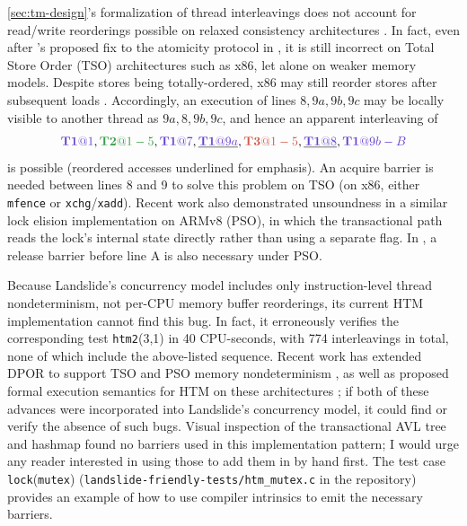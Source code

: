 \cref{sec:tm-design}'s formalization of thread interleavings does not account for read/write reorderings
possible on relaxed consistency architectures \cite{memory-consistency-models}.
In fact,
even after \cite{tm-benchmark-cmu}'s proposed fix to the atomicity protocol in ,
it is still incorrect on Total Store Order (TSO) architectures such as x86,
let alone on weaker memory models.
Despite stores being totally-ordered, x86 may still reorder stores after subsequent loads
\cite{sully-thesis}.
Accordingly, an execution of lines $8,9a,9b,9c$
may be locally visible to another thread as $9a,8,9b,9c$,
and hence an apparent interleaving of
\[
        \tiat{1},\tjat{1-5},\tiat{7},\underline{\tiat{9a}},\tkat{1-5},\underline{\tiat{8}},\tiat{9b-B}
\]
is possible
(reordered accesses underlined for emphasis).
An acquire barrier is needed between lines 8 and 9 to solve this problem on TSO \cite{tsx-need-barrier}
(on x86, either {\tt mfence} or {\tt xchg}/{\tt xadd}).
Recent work \cite{relaxed-transactions-pldi} also demonstrated unsoundness
in a similar lock elision implementation on ARMv8 (PSO),
in which the transactional path reads the lock's internal state directly
rather than using a separate flag.
In , a release barrier before line A is also necessary under PSO.

Because Landslide's concurrency model includes only instruction-level thread nondeterminism,
not per-CPU memory buffer reorderings,
its current HTM implementation cannot find this bug.
In fact, it erroneously verifies the corresponding test {\tt htm2}(3,1)
in 40 CPU-seconds,
with 774 interleavings in total,
none of which include the above-listed sequence.
Recent work has extended DPOR to support TSO and PSO memory nondeterminism \cite{tsopso},
as well as proposed formal execution semantics for HTM on these architectures
\cite{relaxed-transactions-popl,relaxed-transactions-pldi};
if both of these advances were incorporated into Landslide's concurrency model,
it could find or verify the absence of such bugs.
Visual inspection of the transactional AVL tree and hashmap
\cite{tm-benchmark-cmu} found no barriers used in this implementation pattern;
I would urge any reader interested in using those to add them in by hand first.
The test case {\tt lock}({\tt mutex}) ({\tt landslide-friendly-tests/htm\_mutex.c} in the repository)
provides an example of how to use compiler intrinsics to emit the necessary barriers.

